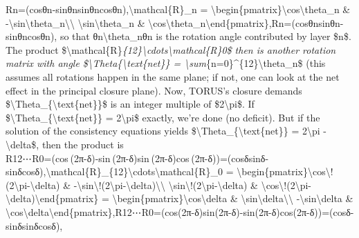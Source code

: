 \documentclass[
]{article}
\begin{document}
Rn=(cos⁡θn-sin⁡θnsin⁡θncos⁡θn),\textbackslash mathcal\{R\}\_n =
\textbackslash begin\{pmatrix\}\textbackslash cos\textbackslash theta\_n
\&
-\textbackslash sin\textbackslash theta\_n\textbackslash\textbackslash{}
\textbackslash sin\textbackslash theta\_n \&
\textbackslash cos\textbackslash theta\_n\textbackslash end\{pmatrix\},Rn\hspace{0pt}=(cosθn\hspace{0pt}sinθn\hspace{0pt}\hspace{0pt}-sinθn\hspace{0pt}cosθn\hspace{0pt}\hspace{0pt}),
so that θn\textbackslash theta\_nθn\hspace{0pt} is the rotation angle
contributed by layer \$n\$. The product
\$\textbackslash mathcal\{R\}\emph{\{12\}\textbackslash cdots\textbackslash mathcal\{R\}0\$
then is another rotation matrix with angle
\$\textbackslash Theta\{\textbackslash text\{net\}\} =
\textbackslash sum}\{n=0\}\^{}\{12\}\textbackslash theta\_n\$ (this
assumes all rotations happen in the same plane; if not, one can look at
the net effect in the principal closure plane). Now, TORUS's closure
demands \$\textbackslash Theta\_\{\textbackslash text\{net\}\}\$ is an
integer multiple of \$2\textbackslash pi\$. If
\$\textbackslash Theta\_\{\textbackslash text\{net\}\} =
2\textbackslash pi\$ exactly, we're done (no deficit). But if the
solution of the consistency equations yields
\$\textbackslash Theta\_\{\textbackslash text\{net\}\} =
2\textbackslash pi - \textbackslash delta\$, then the product is\\
R12⋯R0=(cos⁡ ⁣(2π-δ)-sin⁡ ⁣(2π-δ)sin⁡ ⁣(2π-δ)cos⁡ ⁣(2π-δ))=(cos⁡δsin⁡δ-sin⁡δcos⁡δ),\textbackslash mathcal\{R\}\_\{12\}\textbackslash cdots\textbackslash mathcal\{R\}\_0
=
\textbackslash begin\{pmatrix\}\textbackslash cos\textbackslash!(2\textbackslash pi-\textbackslash delta)
\&
-\textbackslash sin\textbackslash!(2\textbackslash pi-\textbackslash delta)\textbackslash\textbackslash{}
\textbackslash sin\textbackslash!(2\textbackslash pi-\textbackslash delta)
\&
\textbackslash cos\textbackslash!(2\textbackslash pi-\textbackslash delta)\textbackslash end\{pmatrix\}
= \textbackslash begin\{pmatrix\}\textbackslash cos\textbackslash delta
\& \textbackslash sin\textbackslash delta\textbackslash\textbackslash{}
-\textbackslash sin\textbackslash delta \&
\textbackslash cos\textbackslash delta\textbackslash end\{pmatrix\},R12\hspace{0pt}⋯R0\hspace{0pt}=(cos(2π-δ)sin(2π-δ)\hspace{0pt}-sin(2π-δ)cos(2π-δ)\hspace{0pt})=(cosδ-sinδ\hspace{0pt}sinδcosδ\hspace{0pt}),
\end{document}
